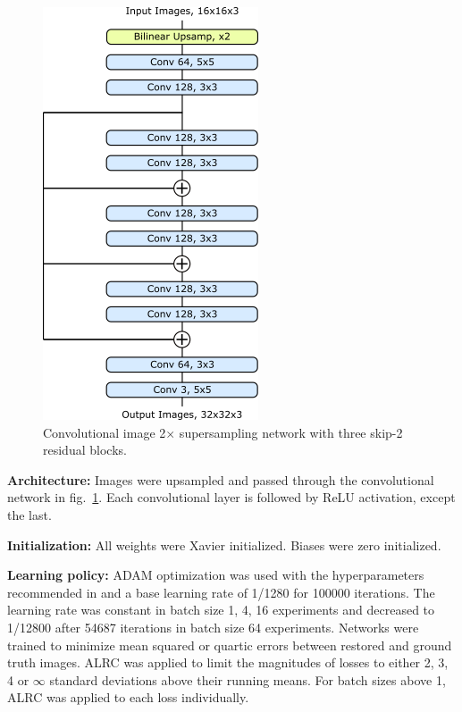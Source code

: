 \documentclass[letterpaper, 10 pt, conference]{ieeeconf}  %
\newcommand\extraspace{3pt}
\begin{document}
\begin{figure}[tbh!]
\centering
\includegraphics[width=0.57\columnwidth]{alrc_architecture.png}
\caption{ Convolutional image 2$\times$ supersampling network with three skip-2 residual blocks. }
\label{alrc_architecture}
\end{figure}

\vspace{\extraspace}
\noindent\textbf{Architecture:} Images were upsampled and passed through the convolutional network in fig.~\ref{alrc_architecture}. Each convolutional layer is followed by ReLU\cite{nair2010rectified} activation, except the last. 

\vspace{\extraspace}
\noindent\textbf{Initialization:} All weights were Xavier\cite{glorot2010understanding} initialized. Biases were zero initialized.

\vspace{\extraspace}
\noindent\textbf{Learning policy:} ADAM optimization was used with the hyperparameters recommended in \cite{kingma2014adam} and a base learning rate of 1/1280 for 100000 iterations. The learning rate was constant in batch size 1, 4, 16 experiments and decreased to 1/12800 after 54687 iterations in batch size 64 experiments. Networks were trained to minimize mean squared or quartic errors between restored and ground truth images. ALRC was applied to limit the magnitudes of losses to either 2, 3, 4 or $\infty$ standard deviations above their running means. For batch sizes above 1, ALRC was applied to each loss individually.
\end{document}
